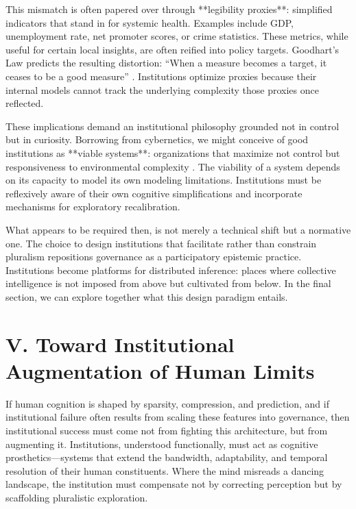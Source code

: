 \documentclass[12pt]{article}  %
\begin{document}
This mismatch is often papered over through **legibility proxies**: simplified indicators that stand in for systemic health. Examples include GDP, unemployment rate, net promoter scores, or crime statistics. These metrics, while useful for certain local insights, are often reified into policy targets. Goodhart’s Law predicts the resulting distortion: “When a measure becomes a target, it ceases to be a good measure” \parencite{strathern1997improving}. Institutions optimize proxies because their internal models cannot track the underlying complexity those proxies once reflected.

These implications demand an institutional philosophy grounded not in control but in curiosity. Borrowing from cybernetics, we might conceive of good institutions as **viable systems**: organizations that maximize not control but responsiveness to environmental complexity \parencite{beer1979heart}. The viability of a system depends on its capacity to model its own modeling limitations. Institutions must be reflexively aware of their own cognitive simplifications and incorporate mechanisms for exploratory recalibration.

What appears to be required then, is not merely a technical shift but a normative one. The choice to design institutions that facilitate rather than constrain pluralism repositions governance as a participatory epistemic practice. Institutions become platforms for distributed inference: places where collective intelligence is not imposed from above but cultivated from below. In the final section, we can explore together what this design paradigm entails.

\section*{V. Toward Institutional Augmentation of Human Limits}

If human cognition is shaped by sparsity, compression, and prediction, and if institutional failure often results from scaling these features into governance, then institutional success must come not from fighting this architecture, but from augmenting it. Institutions, understood functionally, must act as cognitive prosthetics—systems that extend the bandwidth, adaptability, and temporal resolution of their human constituents. Where the mind misreads a dancing landscape, the institution must compensate not by correcting perception but by scaffolding pluralistic exploration.
\end{document}
